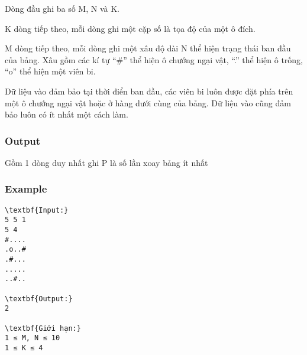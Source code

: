 Dòng đầu ghi ba số M, N và K.

K dòng tiếp theo, mỗi dòng ghi một cặp số là tọa độ của một ô đích.

M dòng tiếp theo, mỗi dòng ghi một xâu độ dài N thể hiện trạng thái ban đầu của bảng. Xâu gồm các kí tự “\#” thể hiện ô chướng ngại vật, “.” thể hiện ô trống, “o” thể hiện một viên bi.

Dữ liệu vào đảm bảo tại thời điển ban đầu, các viên bi luôn được đặt phía trên một ô chướng ngại vật hoặc ở hàng dưới cùng của bảng. Dữ liệu vào cũng đảm bảo luôn có ít nhất một cách làm.

\subsubsection{Output}

Gồm 1 dòng duy nhất ghi P là số lần xoay bảng ít nhất

\subsubsection{Example}
\begin{verbatim}
\textbf{Input:}
5 5 1
5 4
#....
.o..#
.#...
.....
..#..

\textbf{Output:}
2

\textbf{Giới hạn:}
1 ≤ M, N ≤ 10 
1 ≤ K ≤ 4 

\end{verbatim}
